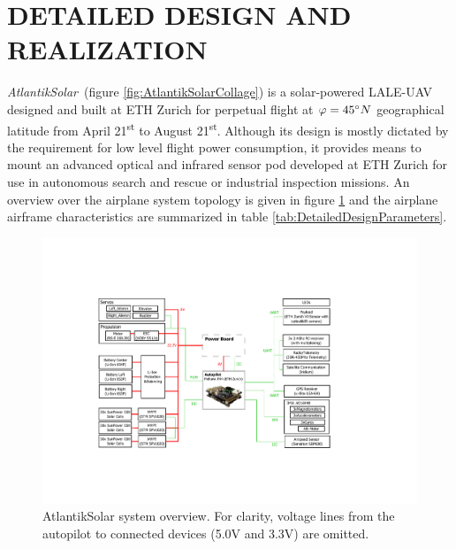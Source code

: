 \section{DETAILED DESIGN AND REALIZATION}\label{sec:detailed_design}

\textit{AtlantikSolar}~(figure \ref{fig:AtlantikSolarCollage}) is a solar-powered LALE-UAV designed and built at ETH Zurich for perpetual flight at $\varphi=45\degree N$ geographical latitude from April 21\textsuperscript{st} to August 21\textsuperscript{st}. Although its design is mostly dictated by the requirement for low level flight power consumption, it provides means to mount an advanced optical and infrared sensor pod developed at ETH Zurich for use in autonomous search and rescue or industrial inspection missions. An overview over the airplane system topology is given in figure \ref{fig:AtlantikSolar_SystemOverview} and the airplane airframe characteristics are summarized in table \ref{tab:DetailedDesignParameters}.

\begin{figure}[t]
    \centering
     \includegraphics[width=\linewidth]{images/8_AtlantikSolar_Avionics}
    \caption{AtlantikSolar system overview. For clarity, voltage lines from the autopilot to connected devices (5.0V and 3.3V) are omitted.}
    \label{fig:AtlantikSolar_SystemOverview}
\end{figure}


